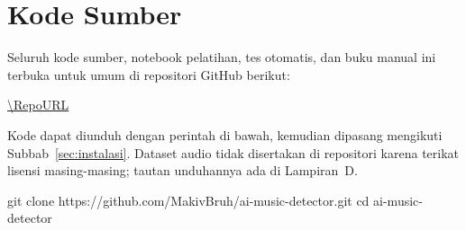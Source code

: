 \section{Kode Sumber}
Seluruh kode sumber, notebook pelatihan, tes otomatis, dan buku manual ini terbuka untuk umum di repositori GitHub berikut:
\begin{center}
\url{\RepoURL}
\end{center}
Kode dapat diunduh dengan perintah di bawah, kemudian dipasang mengikuti Subbab~\ref{sec:instalasi}. Dataset audio tidak disertakan di repositori karena terikat lisensi masing-masing; tautan unduhannya ada di Lampiran~D.
\begin{Perintah}
git clone https://github.com/MakivBruh/ai-music-detector.git
cd ai-music-detector
\end{Perintah}
